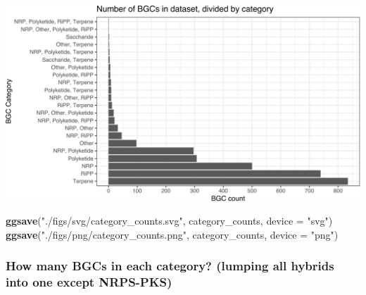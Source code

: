 \documentclass[
]{article}
\newenvironment{Shaded}{\begin{snugshade}}{\end{snugshade}}
\newcommand{\AttributeTok}[1]{\textcolor[rgb]{0.13,0.29,0.53}{#1}}
\newcommand{\FunctionTok}[1]{\textcolor[rgb]{0.13,0.29,0.53}{\textbf{#1}}}
\newcommand{\NormalTok}[1]{#1}
\newcommand{\StringTok}[1]{\textcolor[rgb]{0.31,0.60,0.02}{#1}}
\begin{document}
\includegraphics{analysis_files/figure-latex/unnamed-chunk-7-1.pdf}

\begin{Shaded}
\begin{Highlighting}[]
\FunctionTok{ggsave}\NormalTok{(}\StringTok{"./figs/svg/category\_counts.svg"}\NormalTok{, category\_counts, }\AttributeTok{device =} \StringTok{"svg"}\NormalTok{)}
\FunctionTok{ggsave}\NormalTok{(}\StringTok{"./figs/png/category\_counts.png"}\NormalTok{, category\_counts, }\AttributeTok{device =} \StringTok{"png"}\NormalTok{)}
\end{Highlighting}
\end{Shaded}

\hypertarget{how-many-bgcs-in-each-category-lumping-all-hybrids-into-one-except-nrps-pks}{%
\subsubsection{How many BGCs in each category? (lumping all hybrids into
one except
NRPS-PKS)}\label{how-many-bgcs-in-each-category-lumping-all-hybrids-into-one-except-nrps-pks}}
\end{document}
